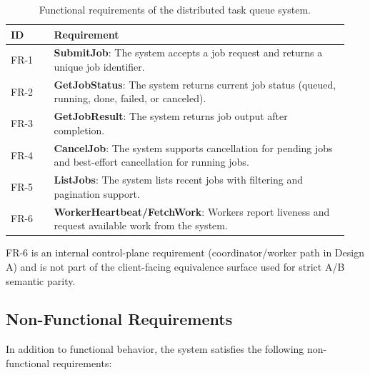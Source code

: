 \documentclass[11pt]{article}
\begin{document}
\begin{table}[H]
\centering
\caption{Functional requirements of the distributed task queue system.}
\label{tab:functional-requirements}
\begin{tabular}{p{0.12\linewidth} p{0.82\linewidth}}
\toprule
\textbf{ID} & \textbf{Requirement} \\
\midrule
FR-1 & \textbf{SubmitJob}: The system accepts a job request and returns a unique job identifier. \\
FR-2 & \textbf{GetJobStatus}: The system returns current job status (queued, running, done, failed, or canceled). \\
FR-3 & \textbf{GetJobResult}: The system returns job output after completion. \\
FR-4 & \textbf{CancelJob}: The system supports cancellation for pending jobs and best-effort cancellation for running jobs. \\
FR-5 & \textbf{ListJobs}: The system lists recent jobs with filtering and pagination support. \\
FR-6 & \textbf{WorkerHeartbeat/FetchWork}: Workers report liveness and request available work from the system. \\
\bottomrule
\end{tabular}
\end{table}
\noindent
FR-6 is an internal control-plane requirement (coordinator/worker path in Design A) and is not part of the client-facing equivalence surface used for strict A/B semantic parity.

\subsection{Non-Functional Requirements}
In addition to functional behavior, the system satisfies the following non-functional requirements:
\end{document}
